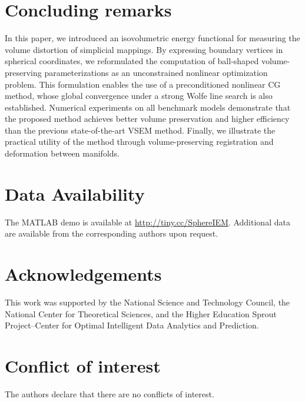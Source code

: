 \documentclass[11pt,a4paper]{article}
\begin{document}
\section{Concluding remarks} 
\label{sec:8}
In this paper, we introduced an isovolumetric energy functional for measuring the volume distortion of simplicial mappings. By expressing boundary vertices in spherical coordinates, we reformulated the computation of ball-shaped volume-preserving parameterizations as an unconstrained nonlinear optimization problem. This formulation enables the use of a preconditioned nonlinear CG method, whose global convergence under a strong Wolfe line search is also established. Numerical experiments on all benchmark models demonstrate that the proposed method achieves better volume preservation and higher efficiency than the previous state-of-the-art VSEM method. Finally, we illustrate the practical utility of the method through volume-preserving registration and deformation between manifolds.





\section*{Data Availability}
The MATLAB demo is available at \url{http://tiny.cc/SphereIEM}. Additional data are available from the corresponding authors upon request.


\section*{Acknowledgements}
This work was supported by the National Science and Technology Council, the National Center for Theoretical Sciences, and the Higher Education Sprout Project--Center for Optimal Intelligent Data Analytics and Prediction.

\section*{Conflict of interest} 
The authors declare that there are no conflicts of interest.


% 
% 
% 

\end{document}
